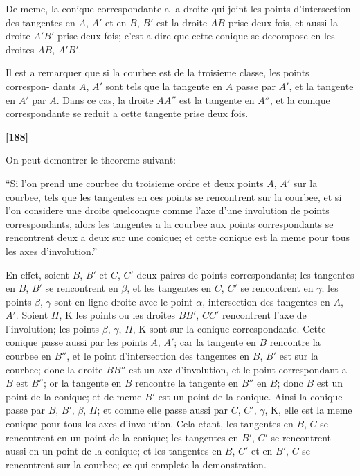 \documentclass[11pt,a4paper]{book}
\begin{document}
De meme, la conique correspondante a la droite qui joint les points d'intersection
des tangentes en $A$, $A'$ et en $B$, $B'$ est la droite $AB$ prise deux fois, et aussi la droite
$A'B'$ prise deux fois; c'est-a-dire que cette conique se decompose en les droites $AB$,
$A'B'$.

Il est a remarquer que si la courbee est de la troisieme classe, les points correspon-
dants $A$, $A'$ sont tels que la tangente en $A$ passe par $A'$, et la tangente en $A'$ par $A$.
Dans ce cas, la droite $AA''$ est la tangente en $A''$, et la conique correspondante se
reduit a cette tangente prise deux fois.

\textbf{[188]}

On peut demontrer le theoreme suivant:

``Si l'on prend une courbee du troisieme ordre et deux points $A$, $A'$ sur la courbee,
tels que les tangentes en ces points se rencontrent sur la courbee, et si l'on considere
une droite quelconque comme l'axe d'une involution de points correspondants, alors
les tangentes a la courbee aux points correspondants se rencontrent deux a deux sur une
conique; et cette conique est la meme pour tous les axes d'involution.''

En effet, soient $B$, $B'$ et $C$, $C'$ deux paires de points correspondants; les tangentes
en $B$, $B'$ se rencontrent en $\beta$, et les tangentes en $C$, $C'$ se rencontrent en $\gamma$; les points
$\beta$, $\gamma$ sont en ligne droite avec le point $\alpha$, intersection des tangentes en $A$, $A'$. Soient
$\Pi$, $\mathrm{K}$ les points ou les droites $BB'$, $CC'$ rencontrent l'axe de l'involution; les points
$\beta$, $\gamma$, $\Pi$, $\mathrm{K}$ sont sur la conique correspondante. Cette conique passe aussi par les
points $A$, $A'$; car la tangente en $B$ rencontre la courbee en $B''$, et le point d'intersection
des tangentes en $B$, $B'$ est sur la courbee; donc la droite $BB''$ est un axe d'involution,
et le point correspondant a $B$ est $B''$; or la tangente en $B$ rencontre la tangente en $B''$
en $B$; donc $B$ est un point de la conique; et de meme $B'$ est un point de la conique.
Ainsi la conique passe par $B$, $B'$, $\beta$, $\Pi$; et comme elle passe aussi par $C$, $C'$, $\gamma$, $\mathrm{K}$,
elle est la meme conique pour tous les axes d'involution. Cela etant, les tangentes en
$B$, $C$ se rencontrent en un point de la conique; les tangentes en $B'$, $C'$ se rencontrent
aussi en un point de la conique; et les tangentes en $B$, $C'$ et en $B'$, $C$ se rencontrent
sur la courbee; ce qui complete la demonstration.
\end{document}
